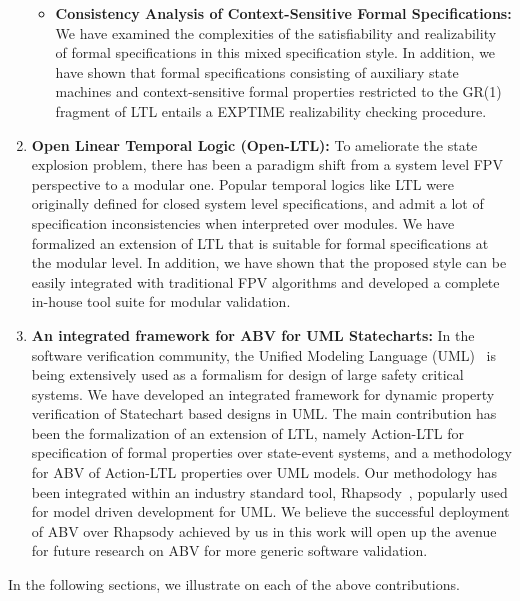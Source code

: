 \documentclass[a4paper, 11pt]{article}
\begin{document}
\begin{enumerate}
\begin{itemize}
\item {\bf Consistency Analysis of Context-Sensitive Formal Specifications:}
	We have examined the complexities of the satisfiability and 
	realizability of formal specifications in this mixed specification 
	style. In addition, we have shown that formal specifications 
	consisting of auxiliary state machines and context-sensitive 
	formal properties restricted to the GR(1)~\cite{nir} fragment of 
	LTL entails a EXPTIME realizability checking procedure.
\end{itemize}
\item {\bf Open Linear Temporal Logic (Open-LTL):} To ameliorate the 
	state explosion
	problem, there has been a paradigm shift from a system level FPV  
	perspective to a modular one. Popular temporal logics like LTL were 
	originally defined for closed system level specifications, and 
	admit a lot of specification inconsistencies when interpreted over 
	modules. We have formalized an extension of LTL that is suitable for 
	formal specifications at the modular level. In addition, we have shown 
	that the proposed style can be easily integrated with traditional 
	FPV algorithms and developed a complete in-house tool suite for 
	modular validation.

\item {\bf An integrated framework for ABV for UML Statecharts:} In the 
	software verification community, the Unified Modeling Language 
	(UML)~\cite{uml}
	is being extensively used as a formalism for design of large 
	safety critical systems. We have developed an integrated framework 
	for dynamic property verification of Statechart based designs in UML. 
	The main contribution has been the formalization of an extension 
	of LTL, namely Action-LTL for specification of formal properties 
	over state-event systems, and a methodology for ABV of Action-LTL 
	properties over UML models. Our methodology has been integrated 
	within an industry standard tool, Rhapsody~\cite{rhap}, popularly used 
	for model driven 
	development for UML. We believe the successful deployment of ABV over 
	Rhapsody achieved by us in this work will open up the avenue for 
	future research on ABV for more generic software validation.
\end{enumerate}

\noindent
In the following sections, we illustrate on each of the above contributions. 
\end{document}
